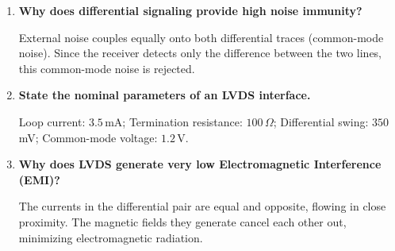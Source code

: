 \documentclass[12pt,a4paper]{article}
\newcommand{\Q}[1]{\textbf{#1}\par\noindent\ignorespaces}
\begin{document}
\begin{tcolorbox}[exambox, title={\textbf{Frequently Asked / Viva Questions}}]
\begin{enumerate}[topsep=0pt, label=\textbf{Q\arabic*.}, itemsep=5pt]
  \item \Q{Why does differential signaling provide high noise immunity?}
    External noise couples equally onto both differential traces (common-mode noise). Since the receiver detects only the difference between the two lines, this common-mode noise is rejected.
  \item \Q{State the nominal parameters of an LVDS interface.}
    Loop current: $3.5\,$mA; Termination resistance: $100\,\Omega$; Differential swing: $350\,$mV; Common-mode voltage: $1.2\,$V.
  \item \Q{Why does LVDS generate very low Electromagnetic Interference (EMI)?}
    The currents in the differential pair are equal and opposite, flowing in close proximity. The magnetic fields they generate cancel each other out, minimizing electromagnetic radiation.
\end{enumerate}
\end{tcolorbox}
\end{document}

